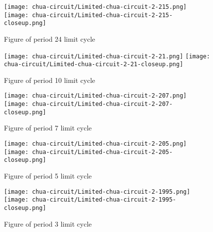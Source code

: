 \documentclass[main]{subfiles}
\begin{document}
\hspace*{-0.2\textwidth}
\begin{minipage}{1.3\textwidth}
\begin{figure}[H]
\centering
\texttt{[image: chua-circuit/Limited-chua-circuit-2-215.png]}
\texttt{[image: chua-circuit/Limited-chua-circuit-2-215-closeup.png]}
\caption[Figure of period 24 limit cycle]{Figure of period 24 limit cycle}
\label{figure:chaotictrajectories}
\end{figure}
\end{minipage}

\hspace*{-0.2\textwidth}
\begin{minipage}{1.3\textwidth}
\begin{figure}[H]
\centering
\texttt{[image: chua-circuit/Limited-chua-circuit-2-21.png]}
\texttt{[image: chua-circuit/Limited-chua-circuit-2-21-closeup.png]}
\caption[Figure of period 10 limit cycle]{Figure of period 10 limit cycle}
\label{figure:chaotictrajectories}
\end{figure}
\end{minipage}

\hspace*{-0.2\textwidth}
\begin{minipage}{1.3\textwidth}
\begin{figure}[H]
\centering
\texttt{[image: chua-circuit/Limited-chua-circuit-2-207.png]}
\texttt{[image: chua-circuit/Limited-chua-circuit-2-207-closeup.png]}
\caption[Figure of period 7 limit cycle]{Figure of period 7 limit cycle}
\label{figure:chaotictrajectories}
\end{figure}
\end{minipage}

\hspace*{-0.2\textwidth}
\begin{minipage}{1.3\textwidth}
\begin{figure}[H]
\centering
\texttt{[image: chua-circuit/Limited-chua-circuit-2-205.png]}
\texttt{[image: chua-circuit/Limited-chua-circuit-2-205-closeup.png]}
\caption[Figure of period 5 limit cycle]{Figure of period 5 limit cycle}
\label{figure:chaotictrajectories}
\end{figure}
\end{minipage}

\hspace*{-0.2\textwidth}
\begin{minipage}{1.3\textwidth}
\begin{figure}[H]
\centering
\texttt{[image: chua-circuit/Limited-chua-circuit-2-1995.png]}
\texttt{[image: chua-circuit/Limited-chua-circuit-2-1995-closeup.png]}
\caption[Figure of period 3 limit cycle]{Figure of period 3 limit cycle}
\label{figure:chaotictrajectories}
\end{figure}
\end{minipage}
\end{document}
